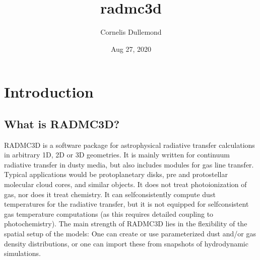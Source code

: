 \documentclass[letterpaper,10pt,english]{sphinxmanual}
\title{radmc3d}
\date{Aug 27, 2020}
\author{Cornelis Dullemond}
\begin{document}
\pagestyle{empty}
\sphinxmaketitle
\pagestyle{plain}
\sphinxtableofcontents
\pagestyle{normal}
\label{\detokenize{index::doc}}



\chapter{Introduction}
\label{\detokenize{introduction:introduction}}\label{\detokenize{introduction::doc}}

\section{What is RADMC\sphinxhyphen{}3D?}
\label{\detokenize{introduction:what-is-radmc-3d}}
RADMC\sphinxhyphen{}3D is a software package for astrophysical radiative transfer calculations
in arbitrary 1\sphinxhyphen{}D, 2\sphinxhyphen{}D or 3\sphinxhyphen{}D geometries. It is mainly written for continuum
radiative transfer in dusty media, but also includes modules for gas line
transfer. Typical applications would be protoplanetary disks, pre\sphinxhyphen{} and
proto\sphinxhyphen{}stellar molecular cloud cores, and similar objects. It does not treat
photoionization of gas, nor does it treat chemistry. It can self\sphinxhyphen{}consistently
compute dust temperatures for the radiative transfer, but it is not equipped for
self\sphinxhyphen{}consistent gas temperature computations (as this requires detailed coupling
to photochemistry). The main strength of RADMC\sphinxhyphen{}3D lies in the flexibility of the
spatial setup of the models: One can create or use parameterized dust and/or gas
density distributions, or one can import these from snapshots of hydrodynamic
simulations.
\end{document}

